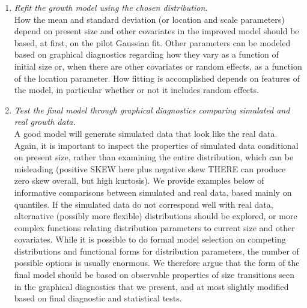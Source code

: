 \documentclass[11pt]{article}
\newcommand{\new}{\textcolor{red}}
\begin{document}
{\begin{enumerate}
\item \textit{Refit the growth model using the chosen distribution.}
\\
How the mean and standard deviation (or location and scale parameters) depend on present size and other covariates in the improved
model should be based, at first, on the pilot Gaussian fit. 
Other parameters can be modeled based on graphical diagnostics regarding how they vary as a function of initial size or, when there are other covariates or random effects, as a function of the location parameter. 
How fitting is accomplished depends on features of the model, in particular whether or not it
includes random effects. 

\item \textit{Test the final model through graphical diagnostics comparing simulated and real growth data.} 
\\
A good model will generate simulated data that look like the real data.  
Again, it is important to inspect the properties of simulated data conditional on present size, rather than examining the entire distribution, which can  be misleading (positive SKEW here plus negative skew THERE can produce zero skew overall, but high kurtosis).  
We provide examples below of informative comparisons between simulated and real data, based mainly on quantiles. 
If the simulated data do not correspond well with real data, alternative (possibly more flexible) distributions should be explored, or more complex
functions relating distribution parameters to current size and other covariates. 
While it is possible to do formal model selection on competing distributions and functional forms for distribution parameters, the number of
possible options is usually enormous. We therefore argue that the form of the final model should be based on observable properties of
size transitions seen in the graphical diagnostics that we present, and at most slightly modified based on 
final diagnostic and statistical tests.

\end{enumerate}

}
\end{document}
